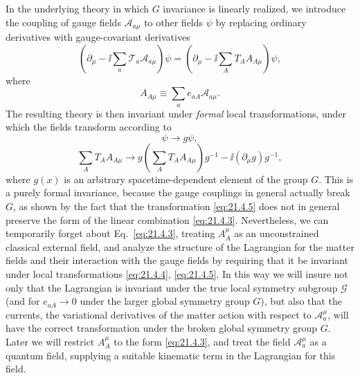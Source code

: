 In the underlying theory in which $G$ invariance is linearly realized, we introduce the coupling of gauge fields $\mathcal A_{a\mu}$ to other fields $\psi$ by replacing ordinary derivatives with gauge-covariant derivatives
\begin{equation}
\left(\partial_\mu-\ii\sum_a\mathcal T_a\mathcal A_{a\mu}\right)\psi
=
\left(\partial_\mu-\ii\sum_A T_A A_{A\mu}\right)\psi,
\tag{21.4.2}\label{eq:21.4.2}
\end{equation}
where
\begin{equation}
A_{A\mu}\equiv\sum_a e_{a A}\mathcal A_{a\mu}.
\tag{21.4.3}\label{eq:21.4.3}
\end{equation}
The resulting theory is then invariant under \emph{formal} local transformations, under which the fields transform according to
\begin{equation}
\psi\longrightarrow g\psi,
\tag{21.4.4}\label{eq:21.4.4}
\end{equation}
\begin{equation}
\sum_A T_A A_{A\mu}
\longrightarrow
g\left(\sum_A T_A A_{A\mu}\right)g^{-1}
-\ii(\partial_\mu g)g^{-1},
\tag{21.4.5}\label{eq:21.4.5}
\end{equation}
where $g(x)$ is an arbitrary spacetime-dependent element of the group $G$. This is a purely formal invariance, because the gauge couplings in general actually break $G$, as shown by the fact that the transformation \eqref{eq:21.4.5} does not in general preserve the form of the linear combination \eqref{eq:21.4.3}. Nevertheless, we can temporarily forget about Eq.~\eqref{eq:21.4.3}, treating $A_A^\mu$ as an unconstrained classical external field, and analyze the structure of the Lagrangian for the matter fields and their interaction with the gauge fields by requiring that it be invariant under local transformations \eqref{eq:21.4.4}, \eqref{eq:21.4.5}. In this way we will insure not only that the Lagrangian is invariant under the true local symmetry subgroup $\mathcal G$ (and for $e_{a A}\to0$ under the larger global symmetry group $G$), but also that the currents, the variational derivatives of the matter action with respect to $\mathcal A_a^\mu$, will have the correct transformation under the broken global symmetry group $G$. Later we will restrict $A_A^\mu$ to the form \eqref{eq:21.4.3}, and treat the field $\mathcal A_a^\mu$ as a quantum field, supplying a suitable kinematic term in the Lagrangian for this field.

